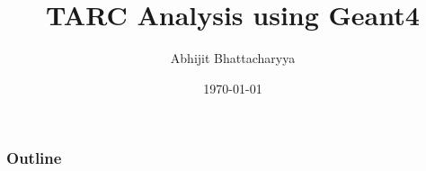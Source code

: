 \documentclass{beamer}
\title{TARC Analysis using Geant4}
\author{Abhijit Bhattacharyya}
\institute{Bhabha Atomic Research Center \\ Mumbai INDIA}
\date{\today}
\begin{document}
    \begin{frame}
        \maketitle
    \end{frame}

    \begin{frame}
        \frametitle{Outline}
        \tableofcontents[part=1, pausesections]
    \end{frame}
\end{document}
